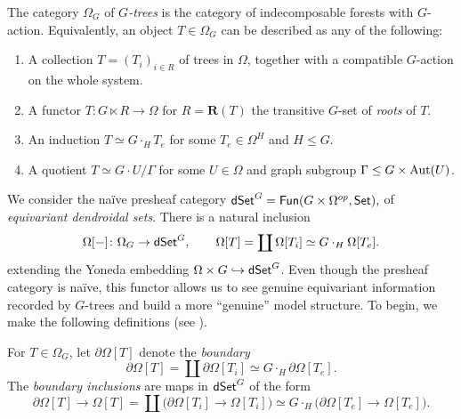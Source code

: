 \documentclass[a4paper,10pt
,draft
]{article}%
\renewcommand{\1}{\eta}%
\begin{document}
\begin{definition}
      The category $\Omega_G$ of \textit{$G$-trees} is the category of indecomposable forests with $G$-action.
      Equivalently, an object $T \in \Omega_G$ can be described as any of the following:
      \begin{enumerate}[label = (\roman*)]
      \item A collection $T = (T_i)_{i \in R}$ of trees in $\Omega$, together with a compatible $G$-action on the whole system.
      \item A functor $T: G \ltimes R \to \Omega$ for $R = \mathbf R(T)$ the transitive $G$-set of \textit{roots} of $T$.
      \item An induction $T \simeq G \cdot_H T_e$ for some $T_e \in \Omega^H$ and $H \leq G$.
      \item A quotient $T \simeq G \cdot U / \Gamma$ for some $U \in \Omega$ and graph subgroup $\Gamma \leq G \times \operatorname{Aut}(U)$.
      \end{enumerate}
\end{definition}

We consider the na\"ive presheaf category 
$
\mathsf{dSet}^G = \mathsf{Fun}(G \times \Omega^{op}, \mathsf{Set}),
$
of \textit{equivariant dendroidal sets}.
There is a natural inclusion
\[
      \Omega[-] \colon \Omega_G \to \mathsf{dSet}^G,
      \qquad
      \Omega[T] = \coprod \Omega[T_i] \simeq G \cdot_H \Omega[T_e].
\]
extending the Yoneda embedding $\Omega \times G \hookrightarrow \mathsf{dSet}^G$.
Even though the presheaf category is na\"ive, this functor allows us to see genuine equivariant information recorded by $G$-trees
and build a more ``genuine'' model structure.
To begin, we make the following definitions (see \cite[\S 6]{Per18}).

\begin{definition}
      For $T \in \Omega_G$, let $\partial \Omega[T]$ denote the \textit{boundary}
      \[
            \partial \Omega[T] = \coprod \partial \Omega[T_i] \simeq G \cdot_H \partial \Omega[T_e].
      \]
      The \textit{boundary inclusions} are maps in $\mathsf{dSet}^G$ of the form
      \[
            \partial \Omega[T] \to \Omega[T] =
            \coprod \big( \partial \Omega[T_i] \to \Omega[T_i]\big) \simeq
            G \cdot_H \big( \partial \Omega[T_e] \to \Omega[T_e] \big).
      \]
\end{definition}
\end{document}
